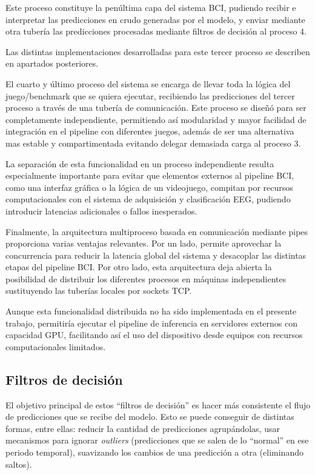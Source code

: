 Este proceso constituye la penúltima capa del sistema BCI, pudiendo recibir e interpretar las predicciones en crudo generadas por el modelo, y enviar mediante otra tubería las predicciones procesadas mediante filtros de decisión al proceso 4.

Las distintas implementaciones desarrolladas para este tercer proceso se describen en apartados posteriores.

El cuarto y último proceso del sistema se encarga de llevar toda la lógica del juego/benchmark que se quiera ejecutar, recibiendo las predicciones del tercer proceso a través de una tubería de comunicación. Este proceso se diseñó para ser completamente independiente, permitiendo así modularidad y mayor facilidad de integración en el pipeline con diferentes juegos, además de ser una alternativa mas estable y compartimentada evitando delegar demasiada carga al proceso 3.

La separación de esta funcionalidad en un proceso independiente resulta especialmente importante para evitar que elementos externos al pipeline BCI, como una interfaz gráfica o la lógica de un videojuego, compitan por recursos computacionales con el sistema de adquisición y clasificación EEG, pudiendo introducir latencias adicionales o fallos inesperados. 

Finalmente, la arquitectura multiproceso basada en comunicación mediante pipes proporciona varias ventajas relevantes. Por un lado, permite aprovechar la concurrencia para reducir la latencia global del sistema y desacoplar las distintas etapas del pipeline BCI. Por otro lado, esta arquitectura deja abierta la posibilidad de distribuir los diferentes procesos en máquinas independientes sustituyendo las tuberías locales por sockets TCP.

Aunque esta funcionalidad distribuida no ha sido implementada en el presente trabajo, permitiría ejecutar el pipeline de inferencia en servidores externos con capacidad GPU, facilitando así el uso del dispositivo desde equipos con recursos computacionales limitados.

\subsection{Filtros de decisión}
\label{subsec:filtros_decision}

El objetivo principal de estos ``filtros de decisión'' es hacer más consistente el flujo de predicciones que se recibe del modelo. Esto se puede conseguir de distintas formas, entre ellas: reducir la cantidad de predicciones agrupándolas, usar mecanismos para ignorar \textit{outliers} (predicciones que se salen de lo ``normal'' en ese periodo temporal), suavizando los cambios de una predicción a otra (eliminando saltos).

